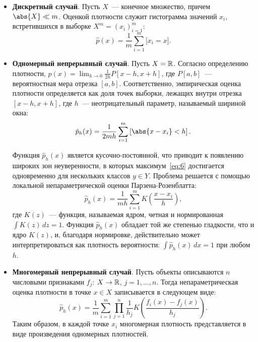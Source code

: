 \begin{itemize}
  \itemsep -5pt
  \item[] \textbf{Дискретный случай}. Пусть \( X \)~--- конечное множество, причем \( \abs{X}\ll m \).
    Оценкой плотности служит гистограмма значений \( x_i \), встретившихся в выборке
    \( X^m = (x_i)^m_{i = 1} \):
    \begin{equation}
      \hat{p}(x) = \frac{1}{m}\sum_{i = 1}^m\bigl[x_i = x\bigr].
      \label{eq:9}
    \end{equation}
    
  \item[] \textbf{Одномерный непрерывный случай}. Пусть \( X = \mathbb{R} \). Согласно определению плотности,
    \( p(x) = \lim_{h\to0} \frac{1}{2h} P[x - h, x + h] \), где \( P[a, b] \)~--- вероятностная мера
    отрезка \( [a, b] \). Соответственно, эмпирическая оценка плотности определяется как доля точек
    выборки, лежащих внутри отрезка \( [x - h, x + h] \), где \( h \)~--- неотрицательный параметр,
    называемый шириной окна:
    \begin{equation}
      \hat{p}_h(x) = \frac{1}{2mh}\sum_{i = 1}^m\left[\abs{x - x_i} < h\right].
      \label{eq:10}
    \end{equation}
    
    Функция \( \hat{p}_h(x) \) является кусочно-постоянной, что приводит к появлению широких зон
    неуверенности, в которых максимум~\eqref{eq:6} достигается одновременно для нескольких классов
    \( y\in Y \). Проблема решается с помощью локальной непараметрической оценки Парзена-Розенблатта:
    \begin{equation}
      \hat{p}_h(x) = \frac{1}{mh}\sum_{i = 1}^m K\left(\frac{x - x_i}{h}\right),
      \label{eq:11}
    \end{equation}
    где \( K(z) \)~--- функция, называемая ядром, четная и нормированная\linebreak
    \( \int K(z)\,dz = 1 \).
    Функция \( \hat{p}_h(x) \) обладает той же степенью гладкости, что и ядро \( K(z) \), и, благодаря
    нормировке, действительно может интерпретироваться как плотность вероятности:
    \( \int\hat{p}_h(x)\,dx = 1 \) при любом \( h \).
    
  \item[] \textbf{Многомерный непрерывный случай}. Пусть объекты описываются \( n \) числовыми
    признаками \( f_j \): \( X\to\mathbb{R} \), \( j = 1, \ldots, n \). Тогда непараметрическая оценка
    плотности в точке \( x\in X \) записывается в следующем виде:
    \begin{equation}
      \hat{p}_h(x) = \frac{1}{m}\sum_{i = 1}^m\prod_{j = 1}^n\frac{1}{h_j}
      K\left(\frac{f_i(x) - f_j(x)}{h_j}\right).
      \label{eq:12}
    \end{equation}
    Таким образом, в каждой точке \( x_i \) многомерная плотность представляется в виде произведения
    одномерных плотностей.
  

\end{itemize}
